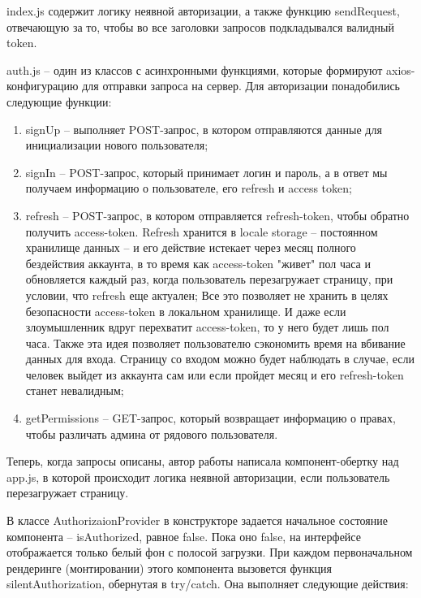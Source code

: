 \documentclass[14pt, a4paper]{diplom}
\begin{document}
index.js содержит логику неявной авторизации, а также функцию sendRequest, отвечающую за то, чтобы во все заголовки запросов подкладывался валидный token.

auth.js -- один из классов с асинхронными функциями, которые формируют axios-конфигурацию для отправки запроса на сервер.
Для авторизации понадобились следующие функции:

\begin{enumerate}
\item signUp -- выполняет POST-запрос, в котором отправляются данные для инициализации нового пользователя;
\item signIn -- POST-запрос, который принимает логин и пароль, а в ответ мы получаем информацию о пользователе, его refresh и access token;
\item refresh -- POST-запрос, в котором отправляется refresh-token, чтобы обратно получить access-token. Refresh хранится в locale storage -- постоянном хранилище данных --
и его действие истекает через месяц полного бездействия аккаунта, в то время как access-token "живет" пол часа и обновляется каждый раз, когда пользователь перезагружает страницу, при условии, что refresh еще актуален;
Все это позволяет не хранить в целях безопасности access-token в локальном хранилище. И даже если злоумышленник вдруг перехватит access-token, то у него будет лишь пол часа. Также эта идея позволяет пользователю сэкономить время на вбивание данных для входа. Страницу со входом можно будет наблюдать в случае, если человек выйдет из аккаунта сам или если пройдет месяц и его refresh-token станет невалидным;
\item getPermissions -- GET-запрос, который возвращает информацию о правах, чтобы различать админа от рядового пользователя.
\end{enumerate}

Теперь, когда запросы описаны, автор работы написала компонент-обертку над app.js, в которой происходит логика неявной авторизации, если пользователь перезагружает страницу.

В классе AuthorizaionProvider в конструкторе задается начальное состояние компонента -- isAuthorized, равное false. Пока оно false, на интерфейсе отображается только белый фон с полосой загрузки. При каждом первоначальном рендеринге (монтировании) этого компонента
вызовется функция silentAuthorization, обернутая в try/catch. Она выполняет следующие действия:
\end{document}
